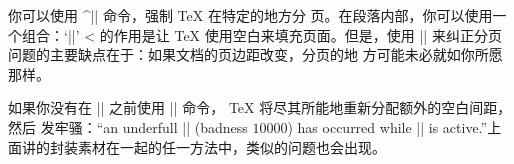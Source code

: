
你可以使用 ^|\eject| 命令\ctsref{\eject}，强制 \TeX{} 在特定的地方分
页。在段落内部，你可以使用一个组合：`|\vadjust{\vfill\eject}|'
\ctsref{\vadjust}
^^| 的作用是让 \TeX{} 使用空白来填充页面。但是，使用
|\eject| 来纠正分页问题的主要缺点在于：如果文档的页边距改变，分页的地
方可能未必就如你所愿那样。


如果你没有在 |\eject| 之前使用 |\vfill| 命令，
\TeX{} 将尽其所能地重新分配额外的空白间距，然后
发牢骚：“an underfull |\vbox| (badness $10000$) has occurred while |\output| is
 active.”上面讲的封装素材在一起的任一方法中，类似的问题也会出现。



